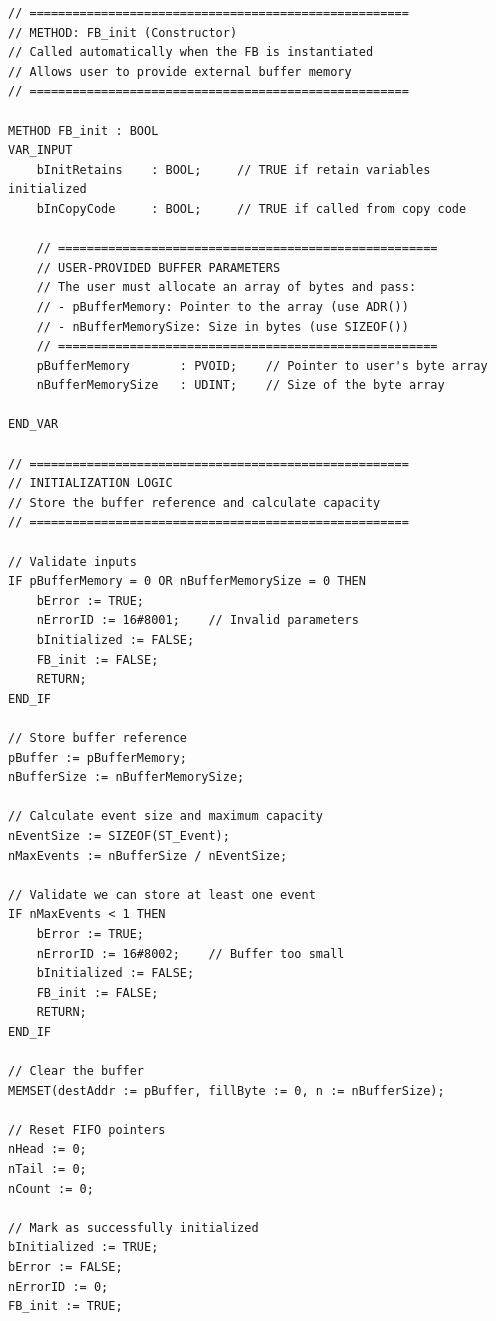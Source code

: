 \documentclass[11pt,a4paper]{article}
\begin{document}
\begin{lstlisting}
// =====================================================
// METHOD: FB_init (Constructor)
// Called automatically when the FB is instantiated
// Allows user to provide external buffer memory
// =====================================================

METHOD FB_init : BOOL
VAR_INPUT
    bInitRetains    : BOOL;     // TRUE if retain variables initialized
    bInCopyCode     : BOOL;     // TRUE if called from copy code
    
    // =====================================================
    // USER-PROVIDED BUFFER PARAMETERS
    // The user must allocate an array of bytes and pass:
    // - pBufferMemory: Pointer to the array (use ADR())
    // - nBufferMemorySize: Size in bytes (use SIZEOF())
    // =====================================================
    pBufferMemory       : PVOID;    // Pointer to user's byte array
    nBufferMemorySize   : UDINT;    // Size of the byte array
    
END_VAR

// =====================================================
// INITIALIZATION LOGIC
// Store the buffer reference and calculate capacity
// =====================================================

// Validate inputs
IF pBufferMemory = 0 OR nBufferMemorySize = 0 THEN
    bError := TRUE;
    nErrorID := 16#8001;    // Invalid parameters
    bInitialized := FALSE;
    FB_init := FALSE;
    RETURN;
END_IF

// Store buffer reference
pBuffer := pBufferMemory;
nBufferSize := nBufferMemorySize;

// Calculate event size and maximum capacity
nEventSize := SIZEOF(ST_Event);
nMaxEvents := nBufferSize / nEventSize;

// Validate we can store at least one event
IF nMaxEvents < 1 THEN
    bError := TRUE;
    nErrorID := 16#8002;    // Buffer too small
    bInitialized := FALSE;
    FB_init := FALSE;
    RETURN;
END_IF

// Clear the buffer
MEMSET(destAddr := pBuffer, fillByte := 0, n := nBufferSize);

// Reset FIFO pointers
nHead := 0;
nTail := 0;
nCount := 0;

// Mark as successfully initialized
bInitialized := TRUE;
bError := FALSE;
nErrorID := 0;
FB_init := TRUE;
\end{lstlisting}
\end{document}
